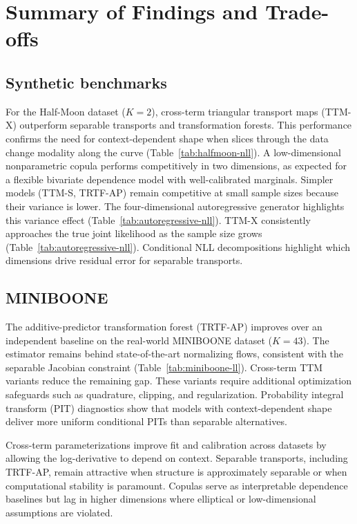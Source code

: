 \documentclass[11pt,a4paper,twoside]{book}\usepackage[]{graphicx}\usepackage[]{xcolor}
\begin{document}
\section{Summary of Findings and Trade-offs}

\subsection{Synthetic benchmarks}

For the Half-Moon dataset ($K=2$), cross-term triangular transport maps (TTM-X) outperform separable transports and transformation forests. This performance confirms the need for context-dependent shape when slices through the data change modality along the curve (Table~\ref{tab:halfmoon-nll}). A low-dimensional nonparametric copula performs competitively in two dimensions, as expected for a flexible bivariate dependence model with well-calibrated marginals. Simpler models (TTM-S, TRTF-AP) remain competitive at small sample sizes because their variance is lower. The four-dimensional autoregressive generator highlights this variance effect (Table~\ref{tab:autoregressive-nll}). TTM-X consistently approaches the true joint likelihood as the sample size grows (Table~\ref{tab:autoregressive-nll}). Conditional NLL decompositions highlight which dimensions drive residual error for separable transports.

\subsection{MINIBOONE}

The additive-predictor transformation forest (TRTF-AP) improves over an independent baseline on the real-world MINIBOONE dataset ($K=43$). The estimator remains behind state-of-the-art normalizing flows, consistent with the separable Jacobian constraint (Table~\ref{tab:miniboone-ll}). Cross-term TTM variants reduce the remaining gap. These variants require additional optimization safeguards such as quadrature, clipping, and regularization. Probability integral transform (PIT) diagnostics show that models with context-dependent shape deliver more uniform conditional PITs than separable alternatives.

Cross-term parameterizations improve fit and calibration across datasets by allowing the log-derivative to depend on context. Separable transports, including TRTF-AP, remain attractive when structure is approximately separable or when computational stability is paramount. Copulas serve as interpretable dependence baselines but lag in higher dimensions where elliptical or low-dimensional assumptions are violated.
\end{document}
